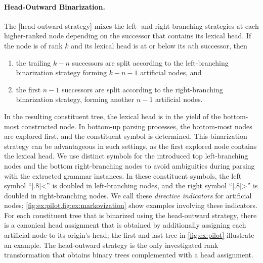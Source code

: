 \documentclass[../../document.tex]{subfiles}
\begin{document}
    \paragraph{Head-Outward Binarization.}
    The [head-outward strategy]  mixes the left- and right-branching strategies at each higher-ranked node depending on the successor that contains its lexical head.
    If the node is of rank \(k\) and its lexical head is at or below its \(n\)th successor, then
    \begin{enumerate}
        \item the trailing \(k-n\) successors are split according to the left-branching binarization strategy forming \(k-n-1\) artificial nodes, and
        \item the first \(n-1\) successors are split according to the right-branching binarization strategy, forming another \(n-1\) artificial nodes.
    \end{enumerate}
    In the resulting constituent tree, the lexical head is in the yield of the bottom-most constructed node.
    In bottom-up parsing processes, the bottom-most nodes are explored first, and the constituent symbol is determined.
    This binarization strategy can be advantageous in such settings, as the first explored node contains the lexical head.
    We use distinct symbols for the introduced top left-branching nodes and the bottom right-branching nodes to avoid ambiguities during parsing with the extracted grammar instances.
    In these constituent symbols, the left symbol ``\scalebox{.4}[.8]{\textless{}}'' is doubled in left-branching nodes, and the right symbol ``\scalebox{.4}[.8]{\textgreater{}}'' is doubled in right-branching nodes.
    We call these \emph{directive indicators} for artificial nodes; \cref{fig:ex:pilot,fig:ex:markovization} show examples involving these indicators.
    For each constituent tree that is binarized using the head-outward strategy, there is a canonical head assignment that is obtained by additionally assigning each artificial node to its origin's head; the first and last tree in \cref{fig:ex:pilot} illustrate an example.
    The head-outward strategy is the only investigated rank transformation that obtains binary trees complemented with a head assignment.
\end{document}
